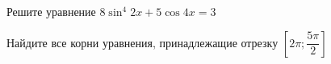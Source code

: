 \begin{ex}
	\begin{condition}
		\begin{enumcols}[label=\asbuk*)]
			\item Решите уравнение \( 8\sin^4 2x + 5\cos 4x = 3  \)
			\item Найдите все корни уравнения, принадлежащие отрезку \( \left[2\pi;\dfrac{5\pi}{2}\right]  \)
		\end{enumcols}
	\end{condition}
\end{ex}